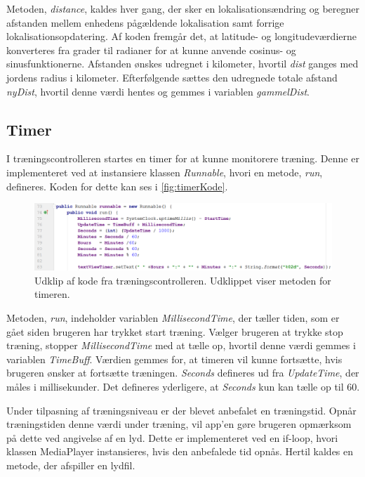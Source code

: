 \noindent
Metoden, \textit{distance}, kaldes hver gang, der sker en lokalisationsændring og beregner afstanden mellem enhedens pågældende lokalisation samt forrige lokalisationsopdatering. Af koden fremgår det, at latitude- og longitudeværdierne konverteres fra grader til radianer for at kunne anvende cosinus- og sinusfunktionerne. 
Afstanden ønskes udregnet i kilometer, hvortil \textit{dist} ganges med jordens radius i kilometer. 
Efterfølgende sættes den udregnede totale afstand \textit{nyDist}, hvortil denne værdi hentes og gemmes i variablen \textit{gammelDist}.   


\subsection{Timer}
I træningscontrolleren startes en timer for at kunne monitorere træning. Denne er implementeret ved at instansiere klassen \textit{Runnable}, hvori en metode, \textit{run}, defineres. Koden for dette kan ses i \autoref{fig:timerKode}.

\begin{figure} [H]
\centering
\includegraphics[width=1\textwidth]{figures/imple/timerKode}
\caption{Udklip af kode fra træningscontrolleren. Udklippet viser metoden for timeren.}
\label{fig:timerKode}
\end{figure} 

\noindent
Metoden, \textit{run}, indeholder variablen \textit{MillisecondTime}, der tæller tiden, som er gået siden brugeren har trykket start træning. Vælger brugeren at trykke stop træning, stopper \textit{MillisecondTime} med at tælle op, hvortil denne værdi gemmes i variablen \textit{TimeBuff}.  Værdien gemmes for, at timeren vil kunne fortsætte, hvis brugeren ønsker at fortsætte træningen. \textit{Seconds} defineres ud fra \textit{UpdateTime}, der måles i millisekunder. Det defineres yderligere, at \textit{Seconds} kun kan tælle op til 60.

Under tilpasning af træningsniveau er der blevet anbefalet en træningstid. Opnår træningstiden denne værdi under træning, vil app'en gøre brugeren opmærksom på dette ved angivelse af en lyd. Dette er implementeret ved en if-loop, hvori klassen MediaPlayer instansieres, hvis den anbefalede tid opnås. Hertil kaldes en metode, der afspiller en lydfil. 



